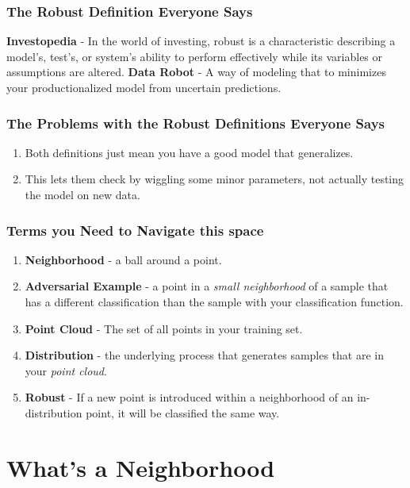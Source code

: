\documentclass{beamer}
\begin{document}
\begin{frame}
    \frametitle{The Robust Definition Everyone Says}
    \textbf{Investopedia} - In the world of investing, robust is a characteristic describing a model's, test's, or system's ability to perform effectively while its variables or assumptions are altered.
    \newline
    \newline
    \textbf{Data Robot} - A way of modeling that to minimizes your productionalized model from uncertain predictions.
\end{frame}

\begin{frame}
    \frametitle{The Problems with the Robust Definitions Everyone Says}
    \begin{enumerate}
        \item Both definitions just mean you have a good model that generalizes.
        \item This lets them check by wiggling some minor parameters, not actually testing the model on new data.
    \end{enumerate}
\end{frame}

\begin{frame}
    \frametitle{Terms you Need to Navigate this space}
    \begin{enumerate}
        \item \textbf{Neighborhood} - a ball around a point.
        \item \textbf{Adversarial Example} - a point in a \textit{small neighborhood} of a sample that has a different classification than the sample with your classification function.
        \item \textbf{Point Cloud} - The set of all points in your training set. 
        \item \textbf{Distribution} - the underlying process that generates samples that are in your \textit{point cloud}.
        \item \textbf{Robust} - If a new point is introduced within a neighborhood of an in-distribution point, it will be classified the same way.
    \end{enumerate}
\end{frame}

\section{What's a Neighborhood}
\end{document}

